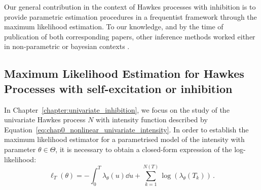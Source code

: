 
    Our general contribution in the context of Hawkes processes with inhibition is to provide parametric estimation procedures in a frequentist framework through the maximum likelihood estimation.
    To our knowledge, and by the time of publication of both corresponding papers, other inference methods worked either in non-parametric \parencite{Reynaud2014,Bacry2016} or bayesian contexts \parencite{Rasmussen2013, Donnet2020, Sulem2021, Deutsch2022}.

    \subsection{Maximum Likelihood Estimation for Hawkes Processes with self-excitation or inhibition}
    
    In Chapter~\ref{chapter:univariate_inhibition}, we focus on the study of the univariate Hawkes process $N$ with intensity function described by Equation~\eqref{eq:chap0_nonlinear_univariate_intensity}.
    In order to establish the maximum likelihood estimator for a parametrised model of the intensity with parameter $\theta\in\Theta$, 
    it is necessary to obtain a closed-form expression of the log-likelihood:
    \[\ell_T(\theta) = - \int_{0}^{T}{\lambda_\theta(u)\dd u} + \sum_{k=1}^{N(T)}{\log(\lambda_\theta(T_k))}\,.\]
    

